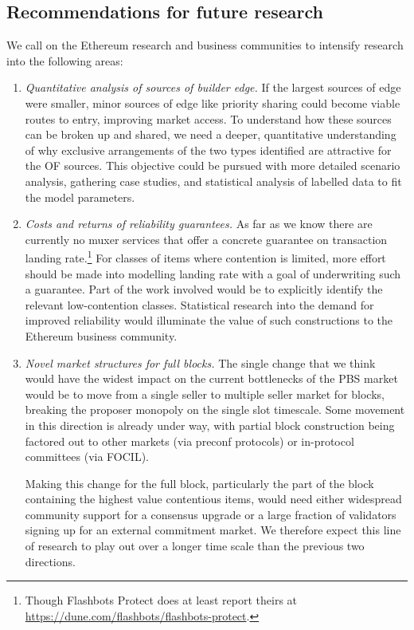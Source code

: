 \subsection*{Recommendations for future research}

We call on the Ethereum research and business communities to intensify research into the following areas:
%
\begin{enumerate}
  \item
    \emph{Quantitative analysis of sources of builder edge.}
    If the largest sources of edge were smaller, minor sources of edge like priority sharing could become viable routes to entry, improving market access.
    To understand how these sources can be broken up and shared, we need a deeper, quantitative understanding of why exclusive arrangements of the two types identified are attractive for the OF sources.
    This objective could be pursued with more detailed scenario analysis, gathering case studies, and statistical analysis of labelled data to fit the model parameters.

  \item
    \emph{Costs and returns of reliability guarantees.}
    As far as we know there are currently no muxer services that offer a concrete guarantee on transaction landing rate.\footnote{Though Flashbots Protect does at least report theirs at \url{https://dune.com/flashbots/flashbots-protect}.}
    For classes of items where contention is limited, more effort should be made into modelling landing rate with a goal of underwriting such a guarantee. 
    Part of the work involved would be to explicitly identify the relevant low-contention classes.
    Statistical research into the demand for improved reliability would illuminate the value of such constructions to the Ethereum business community.

  \item 
    \emph{Novel market structures for full blocks.} 
    The single change that we think would have the widest impact on the current bottlenecks of the PBS market would be to move from a single seller to multiple seller market for blocks, breaking the proposer monopoly on the single slot timescale.
    Some movement in this direction is already under way, with partial block construction being factored out to other markets (via preconf protocols) or in-protocol committees (via FOCIL).
    
    Making this change for the full block, particularly the part of the block containing the highest value contentious items, would need either widespread community support for a consensus upgrade or a large fraction of validators signing up for an external commitment market.
    We therefore expect this line of research to play out over a longer time scale than the previous two directions.
  
\end{enumerate}


